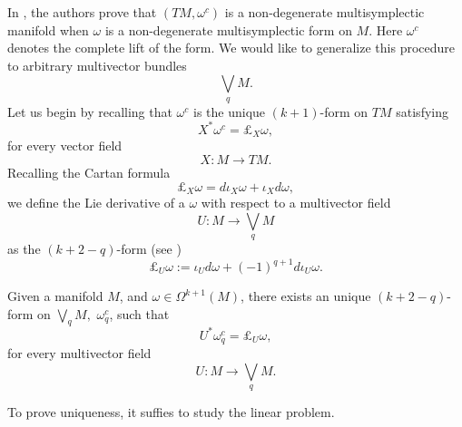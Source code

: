 In \cite{Ibort1999OnTG}, the authors prove that $(TM, \omega^c)$ is a non-degenerate multisymplectic manifold when $\omega$ is a non-degenerate multisymplectic form on $M$. Here $\omega^c$ denotes the complete lift of the form. We would like to generalize this procedure to arbitrary multivector bundles $$\bigvee_q M.$$ Let us begin by recalling that $\omega^c$ is the unique $(k+1)$-form on $TM$ satisfying $$X^\ast \omega^c = \pounds_X \omega,$$ for every vector field $$X: M \rightarrow TM.$$ Recalling the Cartan formula $$\pounds_X \omega = d \iota_X \omega + \iota_X d \omega,$$ we define the Lie derivative of a $\omega$ with respect to a multivector field $$U: M \rightarrow \bigvee_q M$$ as the $(k + 2 - q)$-form (see \cite{TulzcyjewLieDerivative}) $$\pounds_U \omega := \iota_U d \omega + (-1)^{q+1} d \iota_U \omega.$$

\begin{theorem}\label{thm:completelift} Given a manifold $M$, and $\omega \in \Omega^{k +1}(M)$, there exists an unique $(k + 2 - q)$-form on $\bigvee_q M,$ $\omega^c_q$, such that $$U ^\ast \omega^c_q = \pounds_U \omega,$$ for every multivector field $$U: M \rightarrow \bigvee_q M.$$
\end{theorem}
To prove uniqueness, it suffies to study the linear problem. 

